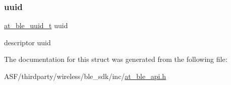 \subsubsection{\texorpdfstring{uuid}{uuid}}
{\footnotesize\ttfamily \mbox{\hyperlink{structat__ble__uuid__t}{at\+\_\+ble\+\_\+uuid\+\_\+t}} uuid}

descriptor uuid 

The documentation for this struct was generated from the following file\+:\begin{DoxyCompactItemize}
\item 
A\+S\+F/thirdparty/wireless/ble\+\_\+sdk/inc/\mbox{\hyperlink{at__ble__api_8h}{at\+\_\+ble\+\_\+api.\+h}}\end{DoxyCompactItemize}
